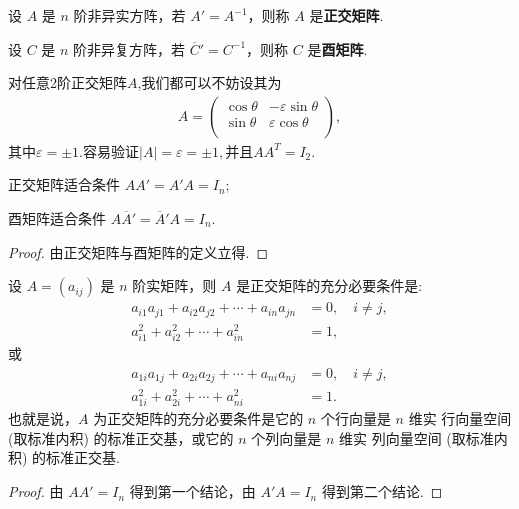 \documentclass[../../main.tex]{subfiles}
\begin{document}
\begin{definition}[正交矩阵和酉矩阵]
设 $A$ 是 $n$ 阶非异实方阵，若 $A' = A^{-1}$，则称 $A$ 是\textbf{正交矩阵}. 

设 $C$ 是 $n$ 阶非异复方阵，若 $\overline{C}' = C^{-1}$，则称 $C$ 是\textbf{酉矩阵}.
\end{definition}
\begin{remark}
对任意2阶正交矩阵$A$,我们都可以不妨设其为
\begin{align*}
A=\left( \begin{matrix}
\cos \theta&		-\varepsilon \sin \theta\\
\sin \theta&		\varepsilon \cos \theta\\
\end{matrix} \right) ,
\end{align*}
其中$\varepsilon=\pm 1$.容易验证$|A|=\varepsilon =\pm 1,$并且$AA^T=I_2.$
\end{remark}

\begin{theorem}
正交矩阵适合条件 $AA' = A'A = I_n$;

酉矩阵适合条件 $A\overline{A}' = \overline{A}'A = I_n$.
\end{theorem}
\begin{proof}
由正交矩阵与酉矩阵的定义立得.

\end{proof}

\begin{theorem}\label{theorem:正交矩阵的基本性质1}
设 $A = (a_{ij})$ 是 $n$ 阶实矩阵，则 $A$ 是正交矩阵的充分必要条件是:
\begin{align*}
a_{i1}a_{j1} + a_{i2}a_{j2} + \cdots + a_{in}a_{jn} &= 0,\quad i \neq j,\\
a_{i1}^2 + a_{i2}^2 + \cdots + a_{in}^2 &= 1,
\end{align*}
或
\begin{align*}
a_{1i}a_{1j} + a_{2i}a_{2j} + \cdots + a_{ni}a_{nj} &= 0,\quad i \neq j,\\
a_{1i}^2 + a_{2i}^2 + \cdots + a_{ni}^2 &= 1.
\end{align*}
也就是说，$A$ 为正交矩阵的充分必要条件是它的 $n$ 个行向量是 $n$ 维实 行向量空间 (取标准内积) 的标准正交基，或它的 $n$ 个列向量是 $n$ 维实 列向量空间 (取标准内积) 的标准正交基.
\end{theorem}
\begin{proof}
由 $AA' = I_n$ 得到第一个结论，由 $A'A = I_n$ 得到第二个结论.

\end{proof}
\end{document}
